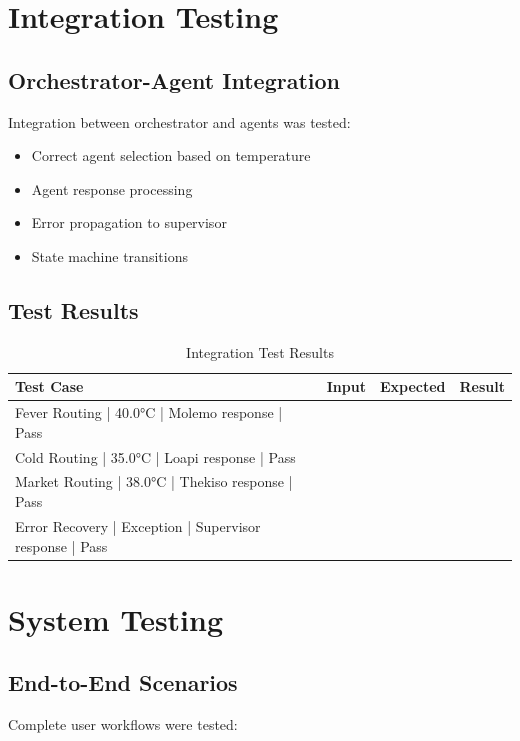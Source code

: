 \section{Integration Testing}

\subsection{Orchestrator-Agent Integration}

Integration between orchestrator and agents was tested:

\begin{itemize}
    \item Correct agent selection based on temperature
    \item Agent response processing
    \item Error propagation to supervisor
    \item State machine transitions
\end{itemize}

\subsection{Test Results}

\begin{table}[H]
\centering
\begin{tabular}{|l|l|l|l|}
\hline
\textbf{Test Case} & \textbf{Input} & \textbf{Expected} & \textbf{Result} \\
\hline
Fever Routing | 40.0°C | Molemo response | Pass \\
Cold Routing | 35.0°C | Loapi response | Pass \\
Market Routing | 38.0°C | Thekiso response | Pass \\
Error Recovery | Exception | Supervisor response | Pass \\
\hline
\end{tabular}
\caption{Integration Test Results}
\end{table}

\section{System Testing}

\subsection{End-to-End Scenarios}

Complete user workflows were tested:

